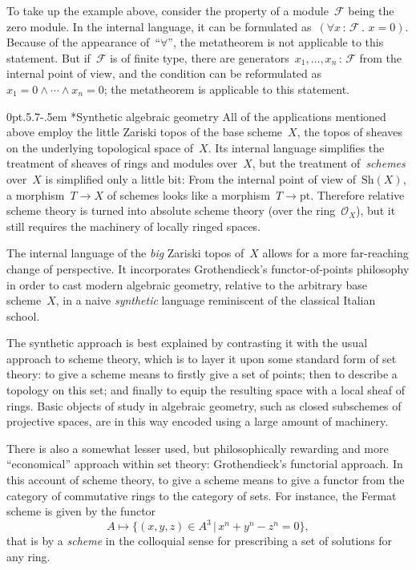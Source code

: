 \documentclass[10pt,reqno,a4paper]{amsbook}
\makeatletter
\theoremstyle{definition}
\theoremstyle{plain}
\theoremstyle{remark}
\newcommand{\F}{\mathcal{F}}
\renewcommand{\O}{\mathcal{O}}
\newcommand{\Sh}{\mathrm{Sh}}
\newcommand{\pt}{\mathrm{pt}}
\newcommand{\?}{\,{:}\,}
\renewcommand{\_}{\mathpunct{.}\,}
\def\subsection{\@startsection{subsection}{2}%
  {0pt}{.5\linespacing\@plus.7\linespacing}{-.5em}%
  {\normalfont\bfseries}}
\makeatother
\begin{document}
{To take up the example above, consider the property of a module~$\F$ being
the zero module. In the internal language, it can be formulated as~$(\forall x\?\F\_ x = 0)$.
Because of the appearance of~``$\forall$'', the metatheorem is not
applicable to this statement. But if~$\F$ is of finite type, there are
generators~$x_1,\ldots,x_n\?\F$ from the internal point of view, and the
condition can be reformulated as~$x_1 = 0 \wedge \cdots \wedge x_n = 0$; the
metatheorem is applicable to this statement.


\subsection*{Synthetic algebraic geometry}
All of the applications mentioned above employ the little Zariski topos of the base
scheme~$X$, the topos of sheaves on the underlying topological space of~$X$.
Its internal language simplifies the treatment of sheaves of rings and modules
over~$X$, but the treatment of~\emph{schemes} over~$X$ is simplified only a
little bit: From the internal point of view of~$\Sh(X)$, a morphism~$T \to X$
of schemes looks like a morphism~$T \to \pt$. Therefore relative scheme theory
is turned into absolute scheme theory (over the ring~$\O_X$), but it still
requires the machinery of locally ringed spaces.

The internal language of the \emph{big} Zariski topos of~$X$ allows for a more far-reaching
change of perspective. It incorporates Grothendieck's functor-of-points
philosophy in order to cast modern algebraic geometry, relative to the arbitrary
base scheme~$X$, in a naive \emph{synthetic} language reminiscent of the classical
Italian school.

The synthetic approach is best explained by contrasting it with the usual
approach to scheme theory, which is to layer it upon some standard form of set theory:
to give a scheme means to firstly give a set of points; then
to describe a topology on this set; and finally to equip the resulting space
with a local sheaf of rings. Basic objects of study in algebraic geometry, such
as closed subschemes of projective spaces, are in this way encoded using a large
amount of machinery.

There is also a somewhat lesser used, but philosophically rewarding and more
``economical'' approach within set theory: Grothendieck's functorial approach.
In this account of scheme theory, to give a scheme means to give a functor
from the category of commutative rings to the category of sets. For instance,
the Fermat scheme is given by the functor
\[ A \longmapsto \{ (x,y,z) \in A^3 \,|\, x^n + y^n - z^n = 0 \}, \]
that is by a \emph{scheme} in the colloquial sense for prescribing a set of
solutions for any ring.

}
\end{document}
